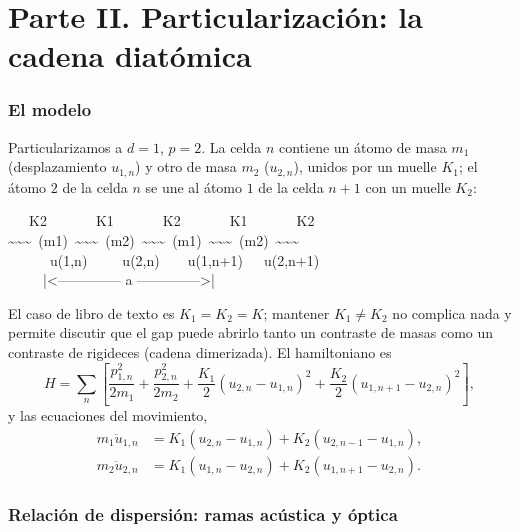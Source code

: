\documentclass[11pt,a4paper]{article}
\begin{document}
\part*{Parte II. Particularización: la cadena diatómica}

\section{El modelo}

Particularizamos a $d=1$, $p=2$. La celda $n$ contiene un átomo de masa $m_1$
(desplazamiento $u_{1,n}$) y otro de masa $m_2$ ($u_{2,n}$), unidos por un
muelle $K_1$; el átomo $2$ de la celda $n$ se une al átomo $1$ de la celda
$n+1$ con un muelle $K_2$:

\begin{center}
\small\ttfamily
\ \ \ K2\ \ \ \ \ \ \ K1\ \ \ \ \ \ \ K2\ \ \ \ \ \ \ K1\ \ \ \ \ \ \ K2\\
\textasciitilde\textasciitilde\textasciitilde\ (m1)\ \textasciitilde\textasciitilde\textasciitilde\ (m2)\ \textasciitilde\textasciitilde\textasciitilde\ (m1)\ \textasciitilde\textasciitilde\textasciitilde\ (m2)\ \textasciitilde\textasciitilde\textasciitilde\\
\ \ \ \ \ \ u(1,n)\ \ \ \ \ u(2,n)\ \ \ \ u(1,n+1)\ \ \ u(2,n+1)\\
\ \ \ \ \ |<-------------- a -------------->|
\end{center}

\noindent El caso de libro de texto es $K_1=K_2=K$; mantener $K_1\neq K_2$ no
complica nada y permite discutir que el gap puede abrirlo tanto un contraste
de masas como un contraste de rigideces (cadena dimerizada). El hamiltoniano es
\begin{equation}
H=\sum_n\left[\frac{p_{1,n}^2}{2m_1}+\frac{p_{2,n}^2}{2m_2}
+\frac{K_1}{2}(u_{2,n}-u_{1,n})^2+\frac{K_2}{2}(u_{1,n+1}-u_{2,n})^2\right],
\end{equation}
y las ecuaciones del movimiento,
\begin{align}
m_1\ddot u_{1,n}&=K_1(u_{2,n}-u_{1,n})+K_2(u_{2,n-1}-u_{1,n}),\\
m_2\ddot u_{2,n}&=K_1(u_{1,n}-u_{2,n})+K_2(u_{1,n+1}-u_{2,n}).
\end{align}

\section{Relación de dispersión: ramas acústica y óptica}
\end{document}
